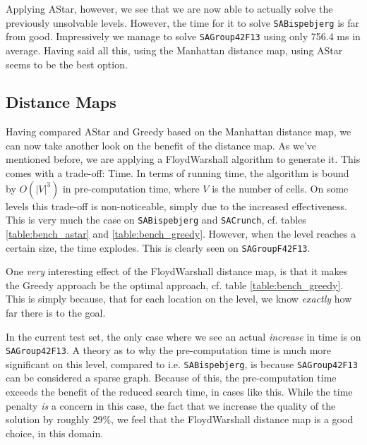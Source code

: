 \documentclass[letterpaper]{article}
\begin{document}
		Applying AStar, however, we see that we are now able to actually solve the previously unsolvable levels. However, the time for it to solve \verb=SABispebjerg= is far from good. Impressively we manage to solve \verb=SAGroup42F13= using only 756.4 ms in average. Having said all this, using the Manhattan distance map, using AStar seems to be the best option.


	\subsection{Distance Maps}
		Having compared AStar and Greedy based on the Manhattan distance map, we can now take another look on the benefit of the distance map. As we've mentioned before, we are applying a FloydWarshall algorithm to generate it. This comes with a trade-off: Time. In terms of running time, the algorithm is bound by $O(|V|^3)$ in pre-computation time, where $V$ is the number of cells. On some levels this trade-off is non-noticeable, simply due to the increased effectiveness. This is very much the case on \verb=SABispebjerg= and \verb=SACrunch=, cf. tables \ref{table:bench_astar} and \ref{table:bench_greedy}. However, when the level reaches a certain size, the time explodes. This is clearly seen on \verb=SAGroupF42F13=.

		One \emph{very} interesting effect of the FloydWarshall distance map, is that it makes the Greedy approach be the optimal approach, cf. table \ref{table:bench_greedy}. This is simply because, that for each location on the level, we know \emph{exactly} how far there is to the goal.

		In the current test set, the only case where we see an actual \emph{increase} in time is on \verb=SAGroup42F13=. A theory as to why the pre-computation time is much more significant on this level, compared to i.e. \verb=SABispebjerg=, is because \verb=SAGroup42F13= can be considered a sparse graph. Because of this, the pre-computation time exceeds the benefit of the reduced search time, in cases like this. While the time penalty \emph{is} a concern in this case, the fact that we increase the quality of the solution by roughly $29\%$, we feel that the FloydWarshall distance map is a good choice, in this domain.
\end{document}
